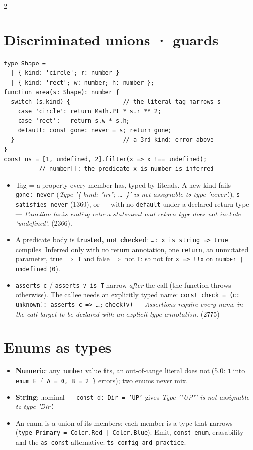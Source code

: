 \documentclass[8pt]{extarticle}
\newcommand\fa{=\pdfonly{\kern0pt}>}
\newcommand\ct[1]{\texttt{#1}}
\newcommand\msg[1]{\textcolor{sheetRed}{\emph{#1}}}
\begin{document}
\begin{multicols}{2}
\section{Discriminated unions · guards}
\begin{lstlisting}[language=TSSheet]
type Shape =
  | { kind: 'circle'; r: number }
  | { kind: 'rect'; w: number; h: number };
function area(s: Shape): number {
  switch (s.kind) {               // the literal tag narrows s
    case 'circle': return Math.PI * s.r ** 2;
    case 'rect':   return s.w * s.h;
    default: const gone: never = s; return gone;
  }                               // a 3rd kind: error above
}
const ns = [1, undefined, 2].filter(x => x !== undefined);
          // number[]: the predicate x is number is inferred
\end{lstlisting}
\begin{itemize}\raggedright
  \item Tag = a property every member has, typed by literals. A new kind fails
        \ct{gone: never} (\msg{Type '\{ kind: "tri"; \ldots\ \}' is not assignable to type
        'never'.}), \ct{s satisfies never} (1360), or — with no \ct{default} under a declared
        return type — \msg{Function lacks ending return statement and return type does not
        include 'undefined'.} (2366).
  \item A predicate body is \textbf{trusted, not checked}: \ct{\ldots: x is string \fa{} true}
        compiles. Inferred only with no return annotation, one \ct{return}, an unmutated
        parameter, true $\Rightarrow$ \ct{T} and false $\Rightarrow$ not \ct{T}: so not for
        \ct{x \fa{} !!x} on \ct{number | undefined} (\ct{0}).
  \item \ct{asserts c} / \ct{asserts v is T} narrow \emph{after} the call (the function throws
        otherwise). The callee needs an explicitly typed name: \ct{const check = (c: unknown):
        asserts c \fa{} \ldots;} \ct{check(v)} — \msg{Assertions require every name in the call
        target to be declared with an explicit type annotation.} (2775)
\end{itemize}

\section{Enums as types}
\begin{itemize}\raggedright
  \item \textbf{Numeric}: any \ct{number} value fits, an out-of-range literal does not (5.0:
        \ct{1} into \ct{enum E \{ A = 0, B = 2 \}} errors); two enums never mix.
  \item \textbf{String}: nominal — \ct{const d: Dir = 'UP'} gives \msg{Type '"UP"' is not
        assignable to type 'Dir'.}
  \item An enum is a union of its members; each member is a type that narrows
        (\ct{type Primary = Color.Red | Color.Blue}). Emit, \ct{const enum}, erasability and the
        \ct{as const} alternative: \ct{ts-config-and-practice}.
\end{itemize}


\end{multicols}
\end{document}
